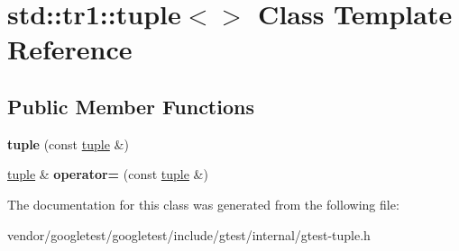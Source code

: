 \hypertarget{classstd_1_1tr1_1_1tuple_3_4}{}\section{std\+:\+:tr1\+:\+:tuple$<$$>$ Class Template Reference}
\label{classstd_1_1tr1_1_1tuple_3_4}
\subsection*{Public Member Functions}
\begin{DoxyCompactItemize}
\item 
\mbox{\label{classstd_1_1tr1_1_1tuple_3_4_aa857599acb126134e29dc5e53fd9d1a7}} 
{\bfseries tuple} (const \mbox{\hyperlink{classstd_1_1tr1_1_1tuple}{tuple}} \&)
\item 
\mbox{\label{classstd_1_1tr1_1_1tuple_3_4_a93ddab6f662662fc49635608619150c8}} 
\mbox{\hyperlink{classstd_1_1tr1_1_1tuple}{tuple}} \& {\bfseries operator=} (const \mbox{\hyperlink{classstd_1_1tr1_1_1tuple}{tuple}} \&)
\end{DoxyCompactItemize}


The documentation for this class was generated from the following file\+:\begin{DoxyCompactItemize}
\item 
vendor/googletest/googletest/include/gtest/internal/gtest-\/tuple.\+h\end{DoxyCompactItemize}
